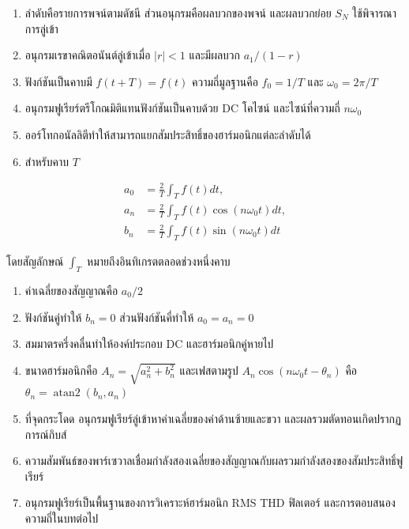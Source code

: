 \begin{enumerate}
\def\labelenumi{\arabic{enumi}.}
\item
  ลำดับคือรายการพจน์ตามดัชนี ส่วนอนุกรมคือผลบวกของพจน์ และผลบวกย่อย \(S_N\) ใช้พิจารณาการลู่เข้า
\item
  อนุกรมเรขาคณิตอนันต์ลู่เข้าเมื่อ \(|r|<1\) และมีผลบวก \(a_1/(1-r)\)
\item
  ฟังก์ชันเป็นคาบมี \(f(t+T)=f(t)\) ความถี่มูลฐานคือ \(f_0=1/T\) และ \(\omega_0=2\pi/T\)
\item
  อนุกรมฟูเรียร์ตรีโกณมิติแทนฟังก์ชันเป็นคาบด้วย DC โคไซน์ และไซน์ที่ความถี่ \(n\omega_0\)
\item
  ออร์โทกอนัลลิตีทำให้สามารถแยกสัมประสิทธิ์ของฮาร์มอนิกแต่ละลำดับได้
\item
  สำหรับคาบ \(T\)
\end{enumerate}

\[
\begin{aligned}
a_0&=\frac{2}{T}\int_T f(t)dt,\\
a_n&=\frac{2}{T}\int_T f(t)\cos(n\omega_0t)dt,\\
b_n&=\frac{2}{T}\int_T f(t)\sin(n\omega_0t)dt
\end{aligned}
\]

โดยสัญลักษณ์ \(\int_T\) หมายถึงอินทิเกรตตลอดช่วงหนึ่งคาบ

\begin{enumerate}
\def\labelenumi{\arabic{enumi}.}
\setcounter{enumi}{6}
\item
  ค่าเฉลี่ยของสัญญาณคือ \(a_0/2\)
\item
  ฟังก์ชันคู่ทำให้ \(b_n=0\) ส่วนฟังก์ชันคี่ทำให้ \(a_0=a_n=0\)
\item
  สมมาตรครึ่งคลื่นทำให้องค์ประกอบ DC และฮาร์มอนิกคู่หายไป
\item
  ขนาดฮาร์มอนิกคือ \(A_n=\sqrt{a_n^2+b_n^2}\) และเฟสตามรูป \(A_n\cos(n\omega_0t-\theta_n)\) คือ \(\theta_n=\operatorname{atan2}(b_n,a_n)\)
\item
  ที่จุดกระโดด อนุกรมฟูเรียร์ลู่เข้าหาค่าเฉลี่ยของค่าด้านซ้ายและขวา และผลรวมตัดทอนเกิดปรากฏการณ์กิบส์
\item
  ความสัมพันธ์ของพาร์เซวาลเชื่อมกำลังสองเฉลี่ยของสัญญาณกับผลรวมกำลังสองของสัมประสิทธิ์ฟูเรียร์
\item
  อนุกรมฟูเรียร์เป็นพื้นฐานของการวิเคราะห์ฮาร์มอนิก RMS THD ฟิลเตอร์ และการตอบสนองความถี่ในบทต่อไป
\end{enumerate}


